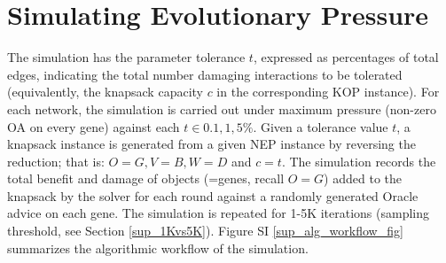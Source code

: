 \documentclass[12pt]{article}	%
\begin{document}
\section{Simulating Evolutionary Pressure}\label{sup_algorithmic_workflow}



			The simulation has the parameter tolerance $t$, expressed as percentages of total edges,  indicating the total number damaging interactions to
			be tolerated (equivalently, the knapsack capacity $c$ in the
			corresponding KOP instance).
			For each network, the simulation is carried out under maximum pressure (non-zero OA on every gene)
			against each $t \in {0.1, 1, 5}\%$.
			Given a tolerance value $t$, a knapsack instance is generated from a given NEP instance by reversing the reduction;
			that is: $O=G, V=B, W=D$ and $c=t$. The simulation records the total benefit and damage of objects (=genes, recall $O=G$)
			added to the knapsack by the solver  \cite{pisinger_where_2005} for each round against a randomly generated Oracle advice on each gene.
			The simulation is repeated for 1-5K iterations (sampling threshold, see Section \ref{sup_1Kvs5K}). Figure SI \ref{sup_alg_workflow_fig} summarizes the algorithmic workflow of the simulation.
\end{document}

